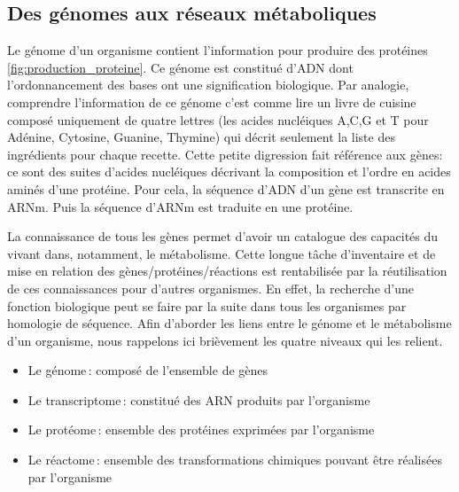 \begin{refsegment}
    
    \section{Des génomes aux réseaux métaboliques}
    
    Le génome d'un organisme contient l'information pour produire des protéines \ref{fig:production_proteine}. Ce génome est constitué d'\gls{ADN} dont l'ordonnancement des bases ont une signification biologique. Par analogie, comprendre l'information de ce génome c'est comme lire un livre de cuisine composé uniquement de quatre lettres (les acides nucléiques A,C,G et T pour Adénine, Cytosine, Guanine, Thymine) qui décrit seulement la liste des ingrédients pour chaque recette. Cette petite digression fait référence aux gènes: ce sont des suites d’acides nucléiques décrivant la composition et l'ordre en acides aminés d'une protéine. Pour cela, la séquence d'\gls{ADN} d'un gène est transcrite en \gls{ARNm}. Puis la séquence d'{ARNm} est traduite en une protéine.
     
    La connaissance de tous les gènes permet d'avoir un catalogue des capacités du vivant dans, notamment, le métabolisme. Cette longue tâche d'inventaire et de mise en relation des gènes/protéines/réactions est rentabilisée par la réutilisation de ces connaissances pour d'autres organismes. En effet, la recherche d'une fonction biologique peut se faire par la suite dans tous les organismes par homologie de séquence. Afin d'aborder les liens entre le génome et le métabolisme d'un organisme, nous rappelons ici brièvement les quatre niveaux qui les relient. 
        
    \begin{itemize}
        \item Le génome : composé de l'ensemble de gènes
        \item Le transcriptome : constitué des \gls{ARN} produits par l'organisme
        \item Le protéome : ensemble des protéines exprimées par l'organisme
        \item Le réactome : ensemble des transformations chimiques pouvant être réalisées par l'organisme
    \end{itemize}

    

\end{refsegment}

